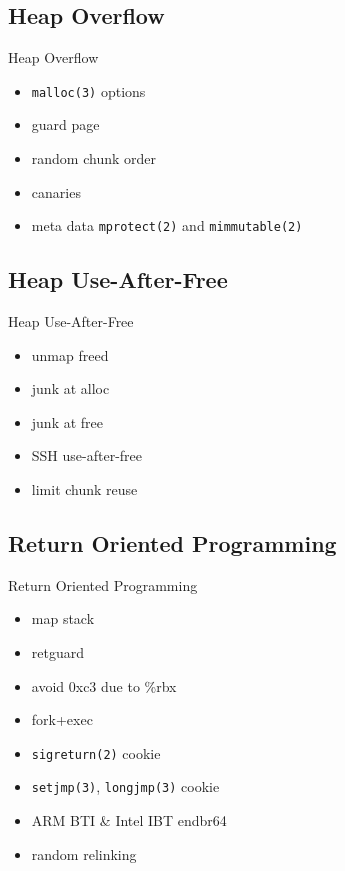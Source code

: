 \documentclass[14pt,aspectratio=169]{beamer}
\begin{document}
\subsection{Heap Overflow}
\begin{frame}{Heap Overflow}
\begin{itemize}
  \item \texttt{malloc(3)} options
  \item guard page
  \item random chunk order
  \item canaries
  \item meta data \texttt{mprotect(2)} and \texttt{mimmutable(2)}
\end{itemize}
\end{frame}

\subsection{Heap Use-After-Free}
\begin{frame}{Heap Use-After-Free}
\begin{itemize}
  \item unmap freed
  \item junk at alloc
  \item junk at free
  \item SSH use-after-free
  \item limit chunk reuse
\end{itemize}
\end{frame}

\subsection{Return Oriented Programming}
\begin{frame}{Return Oriented Programming}
\begin{itemize}
  \item map stack
  \item retguard
  \item avoid 0xc3 due to \%rbx
  \item fork+exec
  \item \texttt{sigreturn(2)} cookie
  \item \texttt{setjmp(3)}, \texttt{longjmp(3)} cookie
  \item ARM BTI \& Intel IBT endbr64
  \item random relinking
\end{itemize}
\end{frame}
\end{document}

